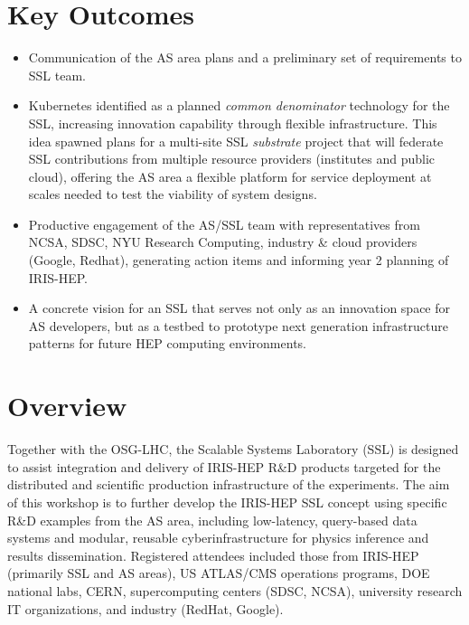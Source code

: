 \documentclass[11pt,letterpaper,fleqn]{article}
\begin{document}
\section*{Key Outcomes}
\vspace{3pt}
\begin{itemize}
  \item Communication of the AS area plans and a preliminary set of requirements to SSL team.
  \item Kubernetes identified as a planned {\it common denominator} technology for the SSL, increasing innovation capability through flexible infrastructure.  This idea spawned plans for a multi-site SSL {\it substrate} project that will federate SSL contributions from multiple resource providers (institutes and public cloud), offering the AS area a flexible platform for service deployment at scales needed to test the viability of system designs.
  \item Productive engagement of the AS/SSL team with representatives from NCSA, SDSC, NYU Research Computing, industry \& cloud providers (Google, Redhat), generating action items and informing year 2 planning of IRIS-HEP.
  \item A concrete vision for an SSL that serves not only as an innovation space for AS developers, but as a testbed to prototype next generation infrastructure patterns for future HEP computing environments.

\end{itemize}


\newpage
\pagestyle{reststyle}

\section{Overview}
Together with the OSG-LHC, the Scalable Systems Laboratory (SSL) is designed to assist integration and delivery of IRIS-HEP R\&D products targeted for the distributed and scientific production infrastructure of the experiments. The aim of this workshop is to further develop the IRIS-HEP SSL concept using specific R\&D examples from the AS area, including  low-latency, query-based data systems and modular, reusable cyberinfrastructure for physics inference and results dissemination. Registered attendees included those from IRIS-HEP (primarily SSL and AS areas), US ATLAS/CMS operations programs, DOE national labs, CERN, supercomputing centers (SDSC, NCSA), university research IT organizations, and industry (RedHat, Google).
\end{document}
